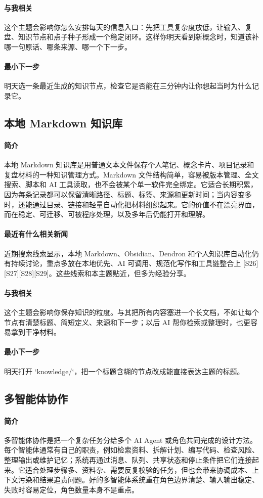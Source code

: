 \documentclass[UTF8,zihao=-4]{ctexart}
\begin{document}
\paragraph{与我相关} 这个主题会影响你怎么安排每天的信息入口：先把工具复杂度放低，让输入、复盘、知识节点和点子种子形成一个稳定闭环。这样你明天看到新概念时，知道该补哪一句原话、哪条来源、哪一个下一步。
\paragraph{最小下一步} 明天选一条最近生成的知识节点，检查它是否能在三分钟内让你想起当时为什么记录它。
\subsection*{本地 Markdown 知识库}
\paragraph{简介} 本地 Markdown 知识库是用普通文本文件保存个人笔记、概念卡片、项目记录和复盘材料的一种知识管理方式。Markdown 文件结构简单，容易被版本管理、全文搜索、脚本和 AI 工具读取，也不会被某个单一软件完全绑定。它适合长期积累，因为每条记录都可以保留清晰路径、标题、标签、来源和更新时间；当内容变多时，还能通过目录、链接和轻量自动化把材料组织起来。它的价值不在漂亮界面，而在稳定、可迁移、可被程序处理，以及多年后仍能打开和理解。
\paragraph{最近有什么相关新闻} 近期搜索线索显示，本地 Markdown、Obsidian、Dendron 和个人知识库自动化仍有持续讨论，重点多放在本地优先、AI 可调用、规范化写作和工具链整合上 [S26][S27][S28][S29]。这些线索和本主题贴近，但多为经验分享。
\paragraph{与我相关} 这个主题会影响你保存知识的粒度。与其把所有内容塞进一个长文档，不如让每个节点有清楚标题、简短定义、来源和下一步；以后 AI 帮你检索或整理时，也更容易拿到干净材料。
\paragraph{最小下一步} 明天打开 `knowledge/`，把一个标题含糊的节点改成能直接表达主题的标题。
\subsection*{多智能体协作}
\paragraph{简介} 多智能体协作是把一个复杂任务分给多个 AI Agent 或角色共同完成的设计方法。每个智能体通常有自己的职责，例如检索资料、拆解计划、编写代码、检查风险、整理输出或维护记忆；系统再通过消息、队列、共享状态和停止条件把它们连接起来。它适合处理步骤多、资料杂、需要反复校验的任务，但也会带来协调成本、上下文污染和结果追责问题。好的多智能体系统重在角色边界清楚、输入输出稳定、失败时容易定位，角色数量本身不是重点。
\end{document}
